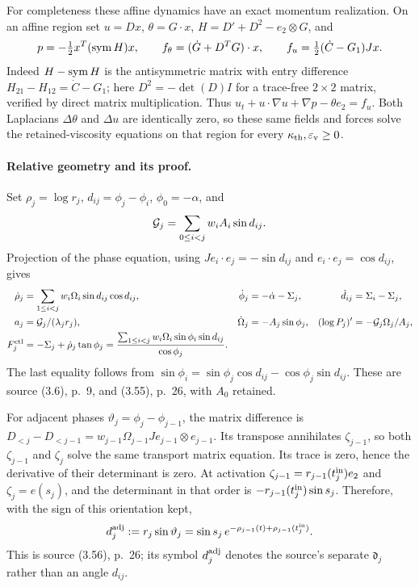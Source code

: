 For completeness these affine dynamics have an exact momentum realization. On an affine region set $u=Dx$, $\theta=G\cdot x$, $H=D'+D^2-e_2\otimes G$, and
\[
 p=-\tfrac12 x^T(\operatorname{sym} H)x,\qquad
 f_\theta=(\dot G+D^TG)\cdot x,\qquad
 f_u=\tfrac12(\dot C-G_1)Jx.
\]
Indeed $H-\operatorname{sym} H$ is the antisymmetric matrix with entry difference $H_{21}-H_{12}=\dot C-G_1$; here $D^2=-\det(D)I$ for a trace-free $2\times2$ matrix, verified by direct matrix multiplication. Thus $u_t+u\cdot\nabla u+\nabla p-\theta e_2=f_u$. Both Laplacians $\Delta\theta$ and $\Delta u$ are identically zero, so these same fields and forces solve the retained-viscosity equations on that region for every $\kappa_{\mathrm{th}},\varepsilon_{\mathrm v}\ge0$.

\paragraph{Relative geometry and its proof.}
Set $\rho_j=\log r_j$, $d_{ij}=\phi_j-\phi_i$, $\phi_0=-\alpha$, and
\[
 \mathcal G_j=\sum_{0\le i<j}w_iA_i\sin d_{ij}.
\]
Projection of the phase equation, using $Je_i\cdot e_j=-\sin d_{ij}$ and $e_i\cdot e_j=\cos d_{ij}$, gives
\begin{align}
 \dot\rho_j&=\sum_{1\le i<j}w_i\Omega_i\sin d_{ij}\cos d_{ij},&
 \dot\phi_j&=-\dot\alpha-\Sigma_j,&\dot d_{ij}&=\Sigma_i-\Sigma_j,\label{cvlane:pc:eq:polar}\\
 a_j&=\mathcal G_j/(\lambda_jr_j),&\dot\Omega_j&=-A_j\sin\phi_j,&
 (\log P_j)'&=-\mathcal G_j\Omega_j/A_j,\nonumber\\
 F_j^{\rm ctl}&=-\Sigma_j+\dot\rho_j\tan\phi_j
 =\frac{\sum_{1\le i<j}w_i\Omega_i\sin\phi_i\sin d_{ij}}{\cos\phi_j}.\nonumber
\end{align}
The last equality follows from $\sin\phi_i=\sin\phi_j\cos d_{ij}-\cos\phi_j\sin d_{ij}$. These are source (3.6), p.~9, and (3.55), p.~26, with $A_0$ retained.

For adjacent phases $\vartheta_j=\phi_j-\phi_{j-1}$, the matrix difference is $D_{<j}-D_{<j-1}=w_{j-1}\Omega_{j-1}Je_{j-1}\otimes e_{j-1}$. Its transpose annihilates $\zeta_{j-1}$, so both $\zeta_{j-1}$ and $\zeta_j$ solve the same transport matrix equation. Its trace is zero, hence the derivative of their determinant is zero. At activation $\zeta_{j-1}=r_{j-1}(t_j^{\rm in})e_2$ and $\zeta_j=e(s_j)$, and the determinant in that order is $-r_{j-1}(t_j^{\rm in})\sin s_j$. Therefore, with the sign of this orientation kept,
\begin{equation}\label{cvlane:pc:eq:determinant}
 d_j^{\rm adj}:=r_j\sin\vartheta_j
 =\sin s_j\,e^{-\rho_{j-1}(t)+\rho_{j-1}(t_j^{\rm in})}.
\end{equation}
This is source (3.56), p.~26; its symbol $d_j^{\rm adj}$ denotes the source's separate $\mathfrak d_j$ rather than an angle $d_{ij}$.

